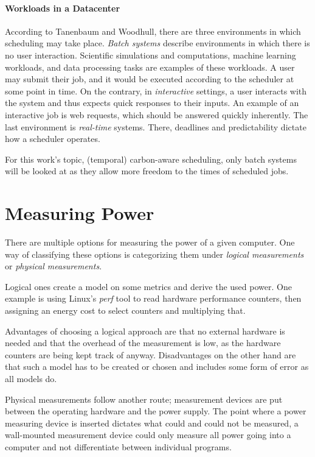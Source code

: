 \paragraph{Workloads in a Datacenter} According to Tanenbaum and Woodhull\cite{tanenbaum_operating_2006}, there are three environments in which scheduling may take place. \emph{Batch systems} describe environments in which there is no user interaction. 
Scientific simulations and computations, machine learning workloads, and data processing tasks are examples of these workloads\cite{sukprasert_limitations_2024}.
A user may submit their job, and it would be executed according to the scheduler at some point in time. 
On the contrary, in \emph{interactive} settings, a user interacts with the system and thus expects quick responses to their inputs. An example of an interactive job is web requests, which should be answered quickly inherently.
The last environment is \emph{real-time} systems. There, deadlines and predictability dictate how a scheduler operates.

For this work's topic, (temporal) carbon-aware scheduling, only batch systems will be looked at as they allow more freedom to the times of scheduled jobs.

\section{Measuring Power}

There are multiple options for measuring the power of a given computer. One way of classifying these options is categorizing them under \emph{logical measurements} or \emph{physical measurements}.

Logical ones create a model on some metrics and derive the used power. One example is using Linux's \emph{perf} tool to read hardware performance counters, then assigning an energy cost to select counters and multiplying that. 

Advantages of choosing a logical approach are that no external hardware is needed and that the overhead of the measurement is low, as the hardware counters are being kept track of anyway. 
Disadvantages on the other hand are that such a model has to be created or chosen and includes some form of error as all models do.

Physical measurements follow another route; measurement devices are put between the operating hardware and the power supply. 
The point where a power measuring device is inserted dictates what could and could not be measured, a wall-mounted measurement device could only measure all power going into a computer and not differentiate between individual programs.

